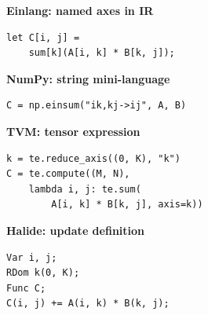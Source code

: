 \begin{minipage}[t]{0.48\linewidth}
\textbf{Einlang: named axes in IR}
\begin{lstlisting}[style=einlang,basicstyle=\ttfamily\footnotesize]
let C[i, j] =
    sum[k](A[i, k] * B[k, j]);
\end{lstlisting}
\end{minipage}
\hfill
\begin{minipage}[t]{0.48\linewidth}
\textbf{NumPy: string mini-language}
\begin{lstlisting}[style=pythoncode,basicstyle=\ttfamily\footnotesize]
C = np.einsum("ik,kj->ij", A, B)
\end{lstlisting}
\end{minipage}

\vspace{0.45\baselineskip}
\begin{minipage}[t]{0.48\linewidth}
\textbf{TVM: tensor expression}
\begin{lstlisting}[style=pythoncode,basicstyle=\ttfamily\footnotesize]
k = te.reduce_axis((0, K), "k")
C = te.compute((M, N),
    lambda i, j: te.sum(
        A[i, k] * B[k, j], axis=k))
\end{lstlisting}
\end{minipage}
\hfill
\begin{minipage}[t]{0.48\linewidth}
\textbf{Halide: update definition}
\begin{lstlisting}[style=pythoncode,basicstyle=\ttfamily\footnotesize]
Var i, j;
RDom k(0, K);
Func C;
C(i, j) += A(i, k) * B(k, j);
\end{lstlisting}
\end{minipage}
